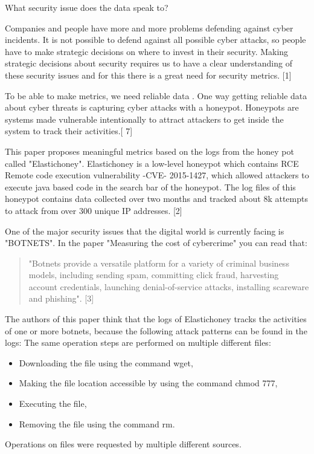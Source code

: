 What security issue does the data speak to?

Companies and people have more and more problems defending against cyber incidents. It is not possible to defend against all possible cyber attacks, so people have to make strategic decisions on where to invest in their security. Making strategic decisions about security requires us to have a clear understanding of these security issues and for this there is a great need for security metrics. [1]

To be able to make metrics, we need reliable data . One way getting reliable data about cyber threats is capturing cyber attacks with a honeypot. Honeypots are systems made vulnerable intentionally to attract attackers to get inside the system to track their activities.[ 7]

This paper proposes meaningful metrics based on the logs from the honey pot called "Elastichoney". Elastichoney is a low-level honeypot which contains RCE Remote code execution vulnerability -CVE- 2015-1427, which allowed attackers to execute java based code in the search bar of the honeypot. The log files of this honeypot contains data collected over two months and tracked about 8k attempts to attack from over 300 unique IP addresses. [2]

One of the major security issues that the digital world is currently facing is "BOTNETS". In the paper "Measuring the cost of cybercrime" you can read that:

\begin{quote}
	"Botnets provide a versatile platform for a variety of criminal business models, including sending spam, committing click fraud, harvesting account credentials, launching denial-of-service attacks, installing scareware and phishing". [3]
\end{quote}

The authors of this paper think that the logs of Elastichoney tracks the activities of one or more botnets, because the following attack patterns can be found in the logs:
The same operation steps are performed on multiple different files:
\begin{itemize}
\item Downloading the file using the command wget,
\item Making the file location accessible by using the command chmod 777,
\item Executing the file,
\item Removing the file using the command rm.
\end{itemize}
Operations on files were requested by multiple different sources.

